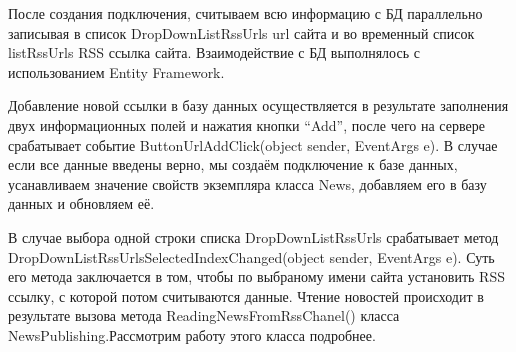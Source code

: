 \documentclass[14pt,a4paper]{extreport}
\begin{document}
\flushleft\hspace{4ex}После создания подключения, считываем всю информацию с БД параллельно записывая в список DropDownListRssUrls url сайта и во временный список listRssUrls RSS ссылка сайта. Взаимодействие с БД выполнялось с использованием Entity Framework.\par
\hspace{4ex}Добавление новой ссылки в базу данных осуществляется в результате заполнения двух информационных полей и нажатия кнопки “Add”, после чего на сервере срабатывает событие ButtonUrlAddClick(object sender, EventArgs e). В случае если все данные введены верно, мы создаём подключение к базе данных, усанавливаем значение свойств экземпляра класса News, добавляем его в базу данных и обновляем её.\par
\hspace{4ex}В случае выбора одной строки списка DropDownListRssUrls срабатывает метод DropDownListRssUrlsSelectedIndexChanged(object sender, EventArgs e). Суть его метода заключается в том, чтобы по выбраному имени сайта установить RSS ссылку, с которой потом считываются данные. Чтение новостей происходит в результате вызова метода ReadingNewsFromRssChanel() класса NewsPublishing.Рассмотрим работу этого класса подробнее.\par
\end{document}
